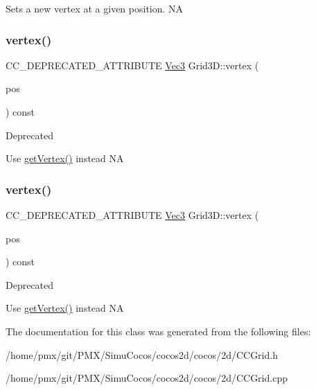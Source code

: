 Sets a new vertex at a given position.  NA \mbox{\label{classGrid3D_afa1183496d0a092d1b95acc423a13514}} 
\subsubsection{\texorpdfstring{vertex()}{vertex()}\hspace{0.1cm}{\footnotesize\ttfamily [1/2]}}
{\footnotesize\ttfamily C\+C\+\_\+\+D\+E\+P\+R\+E\+C\+A\+T\+E\+D\+\_\+\+A\+T\+T\+R\+I\+B\+U\+TE \hyperlink{classVec3}{Vec3} Grid3\+D\+::vertex (\begin{DoxyParamCaption}\item[{const \hyperlink{classVec2}{Vec2} \&}]{pos }\end{DoxyParamCaption}) const\hspace{0.3cm}{\ttfamily [inline]}}

\begin{DoxyRefDesc}{Deprecated}
\item[\hyperlink{deprecated__deprecated000024}{Deprecated}]Use \hyperlink{classGrid3D_aa39962eba8aa705b6b45115ff74a0c6a}{get\+Vertex()} instead  NA \end{DoxyRefDesc}
\mbox{\label{classGrid3D_afa1183496d0a092d1b95acc423a13514}} 
\subsubsection{\texorpdfstring{vertex()}{vertex()}\hspace{0.1cm}{\footnotesize\ttfamily [2/2]}}
{\footnotesize\ttfamily C\+C\+\_\+\+D\+E\+P\+R\+E\+C\+A\+T\+E\+D\+\_\+\+A\+T\+T\+R\+I\+B\+U\+TE \hyperlink{classVec3}{Vec3} Grid3\+D\+::vertex (\begin{DoxyParamCaption}\item[{const \hyperlink{classVec2}{Vec2} \&}]{pos }\end{DoxyParamCaption}) const\hspace{0.3cm}{\ttfamily [inline]}}

\begin{DoxyRefDesc}{Deprecated}
\item[\hyperlink{deprecated__deprecated000254}{Deprecated}]Use \hyperlink{classGrid3D_aa39962eba8aa705b6b45115ff74a0c6a}{get\+Vertex()} instead  NA \end{DoxyRefDesc}


The documentation for this class was generated from the following files\+:\begin{DoxyCompactItemize}
\item 
/home/pmx/git/\+P\+M\+X/\+Simu\+Cocos/cocos2d/cocos/2d/C\+C\+Grid.\+h\item 
/home/pmx/git/\+P\+M\+X/\+Simu\+Cocos/cocos2d/cocos/2d/C\+C\+Grid.\+cpp\end{DoxyCompactItemize}
